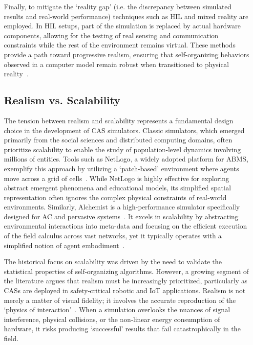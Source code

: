 Finally, to mitigate the `reality gap' (i.e. the discrepancy between simulated results and real-world performance) techniques such as \ac{HIL} and mixed reality are employed. In \ac{HIL} setups, part of the simulation is replaced by actual hardware components, allowing for the testing of real sensing and communication constraints while the rest of the environment remains virtual. These methods provide a path toward progressive realism, ensuring that self-organizing behaviors observed in a computer model remain robust when transitioned to physical reality~\cite{Sende2024}.

\subsection{Realism vs. Scalability}
The tension between realism and scalability represents a fundamental design choice in the development of \ac{CAS} simulators. Classic simulators, which emerged primarily from the social sciences and distributed computing domains, often prioritize scalability to enable the study of population-level dynamics involving millions of entities. Tools such as NetLogo, a widely adopted platform for \ac{ABMS}, exemplify this approach by utilizing a `patch-based' environment where agents move across a grid of cells~\cite{DBLP:journals/simulation/LukeCPSB05}. While NetLogo is highly effective for exploring abstract emergent phenomena and educational models, its simplified spatial representation often ignores the complex physical constraints of real-world environments. Similarly, Alchemist is a high-performance simulator specifically designed for \ac{AC} and pervasive systems~\cite{DBLP:conf/sac/PianiniVB15}. It excels in scalability by abstracting environmental interactions into meta-data and focusing on the efficient execution of the field calculus across vast networks, yet it typically operates with a simplified notion of agent embodiment~\cite{DBLP:conf/sac/PianiniVB15,DBLP:journals/swarm/BrambillaFBD13}.

The historical focus on scalability was driven by the need to validate the statistical properties of self-organizing algorithms. However, a growing segment of the literature argues that realism must be increasingly prioritized, particularly as \acp{CAS} are deployed in safety-critical robotic and \ac{IoT} applications. Realism is not merely a matter of visual fidelity; it involves the accurate reproduction of the `physics of interaction'~\cite{DBLP:journals/swarm/BrambillaFBD13}. When a simulation overlooks the nuances of signal interference, physical collisions, or the non-linear energy consumption of hardware, it risks producing `successful' results that fail catastrophically in the field.

